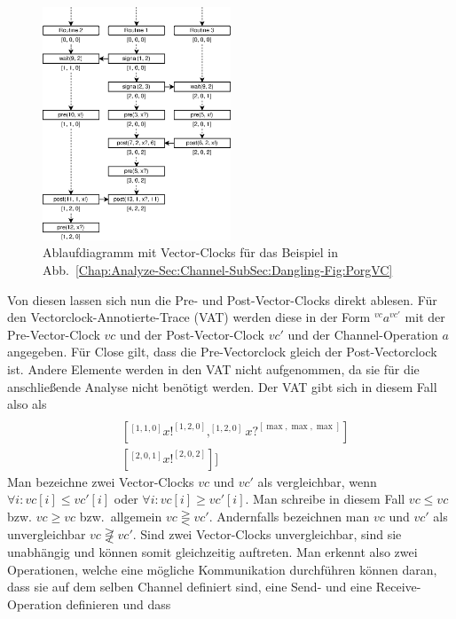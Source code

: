 \begin{figure}[h!]
  \centering
  \includegraphics[width=0.5\textwidth]{img/vector_clock_graph.eps}
  \caption{Ablaufdiagramm mit Vector-Clocks für das Beispiel in Abb.~\ref{Chap:Analyze-Sec:Channel-SubSec:Dangling-Fig:PorgVC}}
  \label{Chap:Analyze-Sec:Channel-SubSec:Dangling-Fig:VC}
\end{figure}
Von diesen lassen sich nun die Pre- und Post-Vector-Clocks direkt ablesen.
Für den Vectorclock-Annotierte-Trace (VAT) werden diese in der Form $^{vc}a^{vc'}$ 
mit der Pre-Vector-Clock $vc$ und der 
Post-Vector-Clock $vc'$ und der Channel-Operation $a$ angegeben. Für Close gilt, 
dass die Pre-Vectorclock gleich der Post-Vectorclock ist. Andere Elemente 
werden in den VAT nicht aufgenommen, da sie 
für die anschließende Analyse nicht benötigt werden.
Der VAT gibt sich in diesem Fall also als
\begin{align*}
  [&[^{[2,0,0]}x?^{[3,0,2]}, ^{[3,0,2]}x?^{[4,2,2]}]\\
  &[^{[1, 1, 0]}x!^{[1, 2, 0]}, ^{[1, 2, 0]}x?^{[\max, \max, \max]}]\\
  &[^{[2, 0, 1]}x!^{[2, 0, 2]}]]
\end{align*}
Man bezeichne zwei Vector-Clocks $vc$ und $vc'$ als vergleichbar, wenn
$\forall i: vc[i] \leq vc'[i]$ oder $\forall i: vc[i] \geq vc'[i]$. Man 
schreibe in diesem Fall $vc \leq vc$ bzw. $vc \geq vc$ bzw.~allgemein 
$vc \gtreqless vc'$. Andernfalls 
bezeichnen man $vc$ und $vc'$ als unvergleichbar $vc \not\gtreqless vc'$. 
Sind zwei Vector-Clocks 
unvergleichbar, sind sie unabhängig und können somit gleichzeitig auftreten. 
Man erkennt also zwei Operationen, welche eine mögliche Kommunikation durchführen 
können daran, dass sie auf dem selben Channel definiert sind, eine Send-
und eine Receive-Operation definieren und dass 
